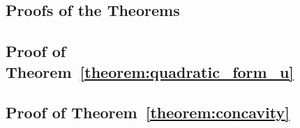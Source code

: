\documentclass[10pt]{article}
\begin{document}



\begin{appendices}

\section{Proofs of the Theorems}\label{section:appendix_a}

\subsection{Proof of Theorem~\ref{theorem:quadratic_form_u}}


\subsection{Proof of Theorem~\ref{theorem:concavity}}\label{appendix:proof_theorem_three}


\end{appendices}
\end{document}

